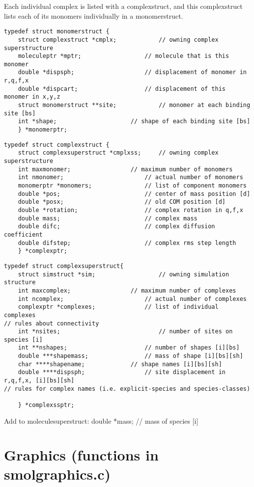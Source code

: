 \documentclass {book}
\begin{document}
Each individual complex is listed with a complexstruct, and this complexstruct lists each of its monomers individually in a monomerstruct.

\begin{lstlisting}
typedef struct monomerstruct {
	struct complexstruct *cmplx;			// owning complex superstructure
	moleculeptr *mptr;					// molecule that is this monomer
	double *dispsph;					// displacement of monomer in r,q,f,x
	double *dispcart;					// displacement of this monomer in x,y,z
	struct monomerstruct **site;			// monomer at each binding site [bs]
	int *shape;						// shape of each binding site [bs]
	} *monomerptr;
\end{lstlisting}


\begin{lstlisting}
typedef struct complexstruct {
	struct complexsuperstruct *cmplxss;		// owning complex superstructure
	int maxmonomer;					// maximum number of monomers
	int nmonomer;						// actual number of monomers
	monomerptr *monomers;				// list of component monomers
	double *pos;						// center of mass position [d]
	double *posx;						// old COM position [d]
	double *rotation;					// complex rotation in q,f,x
	double mass;						// complex mass
	double difc;						// complex diffusion coefficient
	double difstep;						// complex rms step length
	} *complexptr;
\end{lstlisting}


\begin{lstlisting}
typedef struct complexsuperstruct{
	struct simstruct *sim;					// owning simulation structure
	int maxcomplex;					// maximum number of complexes
	int ncomplex;						// actual number of complexes
	complexptr *complexes;				// list of individual complexes
// rules about connectivity
	int *nsites;							// number of sites on species [i]
	int **nshapes;						// number of shapes [i][bs]
	double ***shapemass;				// mass of shape [i][bs][sh]
	char ****shapename;				// shape names [i][bs][sh]
	double ****dispsph;					// site displacement in r,q,f,x, [i][bs][sh]
// rules for complex names (i.e. explicit-species and species-classes)
	
	} *complexssptr;
\end{lstlisting}


Add to moleculesuperstruct:
	double *mass;						// mass of species [i]


\section{Graphics (functions in smolgraphics.c)}
\end{document}
